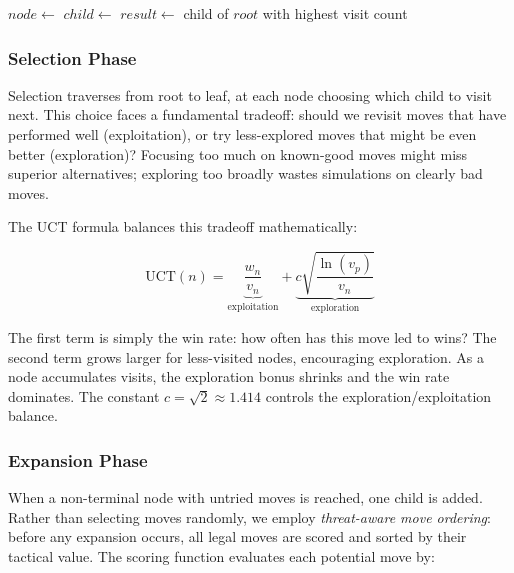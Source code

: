 \documentclass[11pt]{article}
\begin{document}
\begin{algorithm}[H]
\caption{MCTS Search Loop}
\begin{algorithmic}[1]
        \State $node \gets$ 
        \State $child \gets$ 
        \State $result \gets$ 
        \State {}
    \EndFor
    \State \Return child of $root$ with highest visit count
\EndFunction
\end{algorithmic}
\end{algorithm}

\subsubsection{Selection Phase}

Selection traverses from root to leaf, at each node choosing which child to visit next. This choice faces a fundamental tradeoff: should we revisit moves that have performed well (exploitation), or try less-explored moves that might be even better (exploration)? Focusing too much on known-good moves might miss superior alternatives; exploring too broadly wastes simulations on clearly bad moves.

The UCT formula balances this tradeoff mathematically:

\begin{equation}
    \text{UCT}(n) = \underbrace{\frac{w_n}{v_n}}_{\text{exploitation}} + \underbrace{c \sqrt{\frac{\ln(v_p)}{v_n}}}_{\text{exploration}}
\end{equation}

The first term is simply the win rate: how often has this move led to wins? The second term grows larger for less-visited nodes, encouraging exploration. As a node accumulates visits, the exploration bonus shrinks and the win rate dominates. The constant $c = \sqrt{2} \approx 1.414$ controls the exploration/exploitation balance.

\subsubsection{Expansion Phase}

When a non-terminal node with untried moves is reached, one child is added. Rather than selecting moves randomly, we employ \textit{threat-aware move ordering}: before any expansion occurs, all legal moves are scored and sorted by their tactical value. The scoring function evaluates each potential move by:
\end{document}
